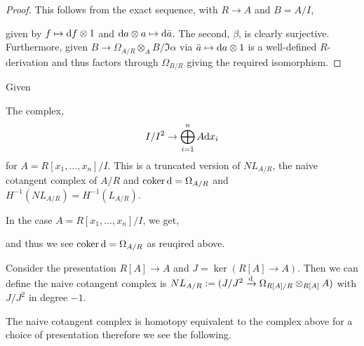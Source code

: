 \documentclass[12pt]{article}
\begin{document}
\begin{proof}
This follows from the exact sequence, with $R \to A$ and $B = A/I$,
\begin{center}
\end{center}
given by $f \mapsto \mathrm{d}{f} \otimes 1$ and $\mathrm{d}{a} \otimes a \mapsto \mathrm{d}{\bar{a}}$. The second, $\beta$, is clearly surjective. Furthermore, given $B \to \Omega_{A/R} \otimes_A B / \Im{\alpha}$ via $\bar{a} \mapsto \mathrm{d}{a} \otimes 1$ is a well-defined $R$-derivation and thus factors through $\Omega_{B/R}$ giving the required isomorphism.
\end{proof}

\begin{prop}
Given 
\end{prop}

\begin{rmk}
The complex,
\[ I/I^2 \to \bigoplus^n_{i = 1} A \mathrm{d}{x_i} \]
for $A = R[x_1, \dots, x_n]/I$. This is a truncated version of $NL_{A/R}$, the naive cotangent complex of $A/R$ and $\operatorname{\mathrm{coker}}{\mathrm{d}} = \Omega_{A/R}$ and $H^{-1}(NL_{A/R}) = H^{-1}(L_{A/R})$. 
\end{rmk}

\begin{rmk}
In the case $A = R[x_1, \dots, x_n]/I$, we get,
\begin{center}
\end{center}
and thus we see $\operatorname{\mathrm{coker}}{\mathrm{d}} = \Omega_{A/R}$ as reuqired above.
\end{rmk}

\begin{defn}
Consider the presentation $R[A] \to A$ and $J = \ker{(R[A] \to A)}$. Then we can define the naive cotangent complex is $NL_{A/R} := (J/J^2 \xrightarrow{\mathrm{d}} \Omega_{R[A]/R} \otimes_{R[A]} A)$ with $J/J^2$ in degree $-1$.
\end{defn}

\begin{rmk}
The naive cotangent complex is homotopy equivalent to the complex above for a choice of presentation therefore we see the following.
\end{rmk}
\end{document}
